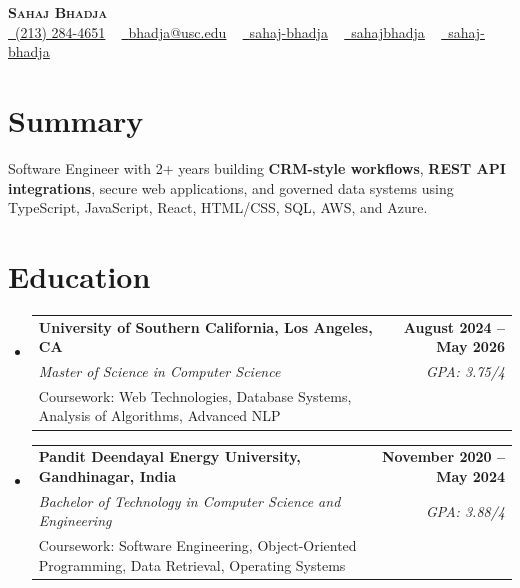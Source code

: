 \documentclass[letterpaper,10pt]{article}
\makeatletter
\newcommand{\sectionGap}{\vspace{-8pt}}
\newcommand{\resumeEduSubheading}[5]{\vspace{-1pt}\item\begin{tabular*}{1.0\textwidth}[t]{l@{\extracolsep{\fill}}r}\textbf{#1} & \textbf{\small #2} \\\textit{\small #3} & \textit{\small #4} \\\small #5 & \\\end{tabular*}\vspace{-4pt}}
\newcommand{\resumeSubHeadingListStart}{\begin{itemize}[leftmargin=0.0in, label={}]}
\newcommand{\resumeSubHeadingListEnd}{\end{itemize}}
\makeatother
\begin{document}
\begin{center}
{\Huge \scshape \textbf{Sahaj Bhadja}} \\ \vspace{1pt}
\small \href{tel:2132844651}{\faPhone\ \underline{(213) 284-4651}} ~ \href{mailto:bhadja@usc.edu}{\raisebox{-0.2\height}\faEnvelope\ \underline{bhadja@usc.edu}} ~
\href{https://www.linkedin.com/in/sahaj-bhadja/}{\raisebox{-0.2\height}\faLinkedin\ \underline{sahaj-bhadja}} ~ \href{https://github.com/SAHAJ-BHADJA}{\raisebox{-0.2\height}\faGithub\ \underline{sahajbhadja}} ~
\href{https://sahaj-bhadja.vercel.app/}{\raisebox{-0.2\height}\faGlobe\ \underline{sahaj-bhadja}}
\end{center}
\vspace{-16pt}
\section{Summary}
\begin{itemize}[leftmargin=0.15in, label={}]
\small{\item{Software Engineer with 2+ years building \textbf{CRM-style workflows}, \textbf{REST API integrations}, secure web applications, and governed data systems using TypeScript, JavaScript, React, HTML/CSS, SQL, AWS, and Azure.}}
\end{itemize}
\sectionGap
\section{Education}
\resumeSubHeadingListStart
\resumeEduSubheading{University of Southern California, Los Angeles, CA}{August 2024 -- May 2026}{Master of Science in Computer Science}{GPA: 3.75/4}{Coursework: Web Technologies, Database Systems, Analysis of Algorithms, Advanced NLP}
\resumeEduSubheading{Pandit Deendayal Energy University, Gandhinagar, India}{November 2020 -- May 2024}{Bachelor of Technology in Computer Science and Engineering}{GPA: 3.88/4}{Coursework: Software Engineering, Object-Oriented Programming, Data Retrieval, Operating Systems}
\resumeSubHeadingListEnd
\sectionGap
\end{document}
